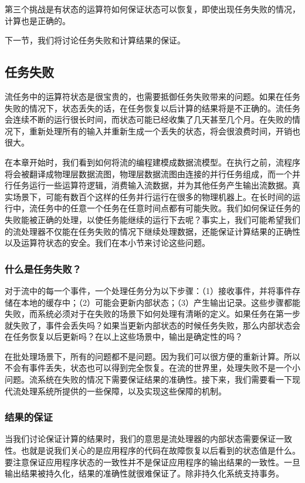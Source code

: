\documentclass[oneside]{ctexbook}
\begin{document}
第三个挑战是有状态的运算符如何保证状态可以恢复，即使出现任务失败的情况，计算也是正确的。

下一节，我们将讨论任务失败和计算结果的保证。

\subsection{任务失败}

流任务中的运算符状态是很宝贵的，也需要抵御任务失败带来的问题。如果在任务失败的情况下，状态丢失的话，在任务恢复以后计算的结果将是不正确的。流任务会连续不断的运行很长时间，而状态可能已经收集了几天甚至几个月。在失败的情况下，重新处理所有的输入并重新生成一个丢失的状态，将会很浪费时间，开销也很大。

在本章开始时，我们看到如何将流的编程建模成数据流模型。在执行之前，流程序将会被翻译成物理层数据流图，物理层数据流图由连接的并行任务组成，而一个并行任务运行一些运算符逻辑，消费输入流数据，并为其他任务产生输出流数据。真实场景下，可能有数百个这样的任务并行运行在很多的物理机器上。在长时间的运行中，流任务中的任意一个任务在任意时间点都有可能失败。我们如何保证任务的失败能被正确的处理，以使任务能继续的运行下去呢？事实上，我们可能希望我们的流处理器不仅能在任务失败的情况下继续处理数据，还能保证计算结果的正确性以及运算符状态的安全。我们在本小节来讨论这些问题。

\subsubsection{什么是任务失败？}

对于流中的每一个事件，一个处理任务分为以下步骤：（1）接收事件，并将事件存储在本地的缓存中；（2）可能会更新内部状态；（3）产生输出记录。这些步骤都能失败，而系统必须对于在失败的场景下如何处理有清晰的定义。如果任务在第一步就失败了，事件会丢失吗？如果当更新内部状态的时候任务失败，那么内部状态会在任务恢复以后更新吗？在以上这些场景中，输出是确定性的吗？

在批处理场景下，所有的问题都不是问题。因为我们可以很方便的重新计算。所以不会有事件丢失，状态也可以得到完全恢复。在流的世界里，处理失败不是一个小问题。流系统在失败的情况下需要保证结果的准确性。接下来，我们需要看一下现代流处理系统所提供的一些保障，以及实现这些保障的机制。

\subsubsection{结果的保证}

当我们讨论保证计算的结果时，我们的意思是流处理器的内部状态需要保证一致性。也就是说我们关心的是应用程序的代码在故障恢复以后看到的状态值是什么。要注意保证应用程序状态的一致性并不是保证应用程序的输出结果的一致性。一旦输出结果被持久化，结果的准确性就很难保证了。除非持久化系统支持事务。
\end{document}
